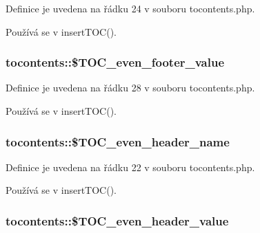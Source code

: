 Definice je uvedena na řádku 24 v souboru tocontents.\-php.



Používá se v insert\-T\-O\-C().

\hypertarget{classtocontents_a5347198b21de43ec13ddc4720b863706}{
\subsubsection[{\$\-T\-O\-C\-\_\-even\-\_\-footer\-\_\-value}]{\setlength{\rightskip}{0pt plus 5cm}tocontents\-::\$\-T\-O\-C\-\_\-even\-\_\-footer\-\_\-value}}\label{classtocontents_a5347198b21de43ec13ddc4720b863706}


Definice je uvedena na řádku 28 v souboru tocontents.\-php.



Používá se v insert\-T\-O\-C().

\hypertarget{classtocontents_a97f539b62215d53a7ccd955aa29da653}{
\subsubsection[{\$\-T\-O\-C\-\_\-even\-\_\-header\-\_\-name}]{\setlength{\rightskip}{0pt plus 5cm}tocontents\-::\$\-T\-O\-C\-\_\-even\-\_\-header\-\_\-name}}\label{classtocontents_a97f539b62215d53a7ccd955aa29da653}


Definice je uvedena na řádku 22 v souboru tocontents.\-php.



Používá se v insert\-T\-O\-C().

\hypertarget{classtocontents_a32150b2268ee4935928c84d4183300ac}{
\subsubsection[{\$\-T\-O\-C\-\_\-even\-\_\-header\-\_\-value}]{\setlength{\rightskip}{0pt plus 5cm}tocontents\-::\$\-T\-O\-C\-\_\-even\-\_\-header\-\_\-value}}\label{classtocontents_a32150b2268ee4935928c84d4183300ac}


